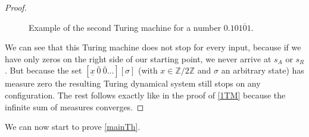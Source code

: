 \documentclass[12pt,a4paper]{scrartcl}
\theoremstyle{plain}
\theoremstyle{definition}
\newcommand{\2}{\mathbb{Z} / 2 \mathbb{Z}}
\newcommand{\1}{\bar{1}}
\newcommand{\0}{\bar{0}}
\begin{document}
\begin{proof}
\begin{figure}[]
		\caption{Example of the second Turing machine for a number $0.10 \overline{101}$.}
		\label{Graphik_zweite_TM}
	\end{figure}
	
	We can see that this Turing machine does not stop for every input, because if we have only zeros on the right side of our starting point, we never arrive at $s_A$ or $s_R$. But because the set $[\underline{x} \ \0 \ \0 \ldots][\sigma]$ (with $x \in \2$ and $\sigma$ an arbitrary state) has measure zero the resulting Turing dynamical system still stops on any configuration. The rest follows exactly like in the proof of \ref{1TM} because the infinite sum of measures converges.
\end{proof}

We can now start to prove \ref{mainTh}.

\mainTh*
\end{document}
